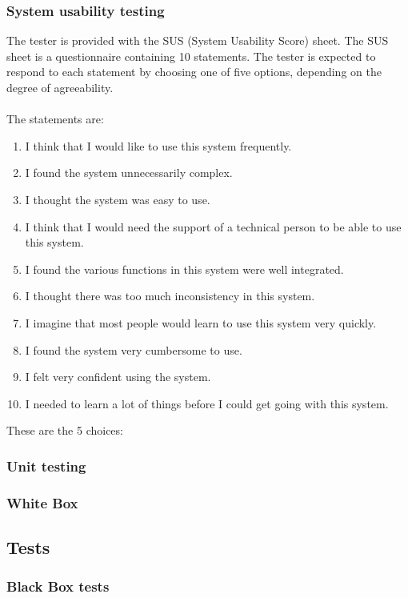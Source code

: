 \subsubsection{System usability testing}
The tester is provided with the SUS (System Usability Score) sheet. The SUS sheet is a questionnaire containing 10 statements. The tester is expected to respond to each statement by choosing one of five options, depending on the degree of agreeability.\\
\\
The statements are:
\begin{enumerate} \setlength{\itemsep}{0cm}\setlength{\parskip}{0cm}
	\item I think that I would like to use this system frequently.
	\item I found the system unnecessarily complex.
	\item I thought the system was easy to use.
	\item I think that I would need the support of a technical person to be able to use this system.
	\item I found the various functions in this system were well integrated.
	\item I thought there was too much inconsistency in this system.
	\item I imagine that most people would learn to use this system very quickly.
	\item I found the system very cumbersome to use.
	\item I felt very confident using the system.
	\item I needed to learn a lot of things before I could get going with this system.
\end{enumerate}
These are the 5 choices:




\subsubsection{Unit testing}

\subsubsection{White Box}












\subsection{Tests}
\subsubsection{Black Box tests}




